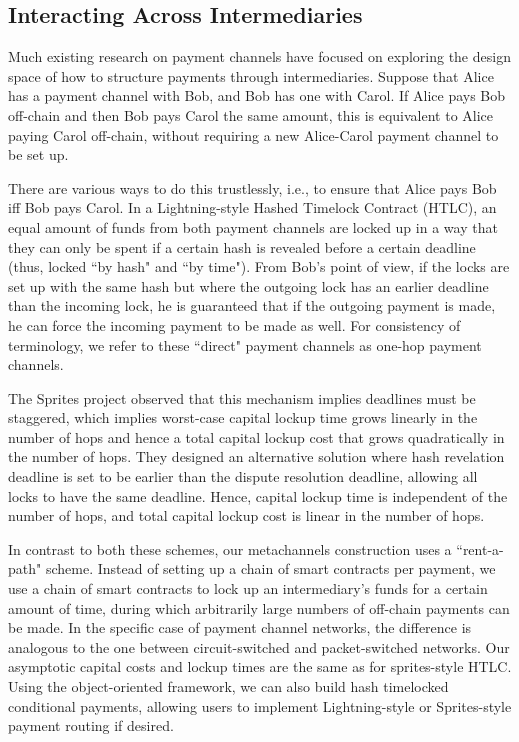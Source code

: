 \documentclass[prb,floatfix,reprint,nofootinbib,amsmath,amssymb,epsfig,pre,floats,letterpaper,groupedaffiliation,tightenlines,allcolors=blue,11pt]{revtex4}
\theoremstyle{definition}
\theoremstyle{definition}
\theoremstyle{definition}
\begin{document}
\subsection{Interacting Across Intermediaries}

Much existing research on payment channels have focused on exploring the design space of how to structure payments through intermediaries. Suppose that Alice has a payment channel with Bob, and Bob has one with Carol. If Alice pays Bob off-chain and then Bob pays Carol the same amount, this is equivalent to Alice paying Carol off-chain, without requiring a new Alice-Carol payment channel to be set up.

There are various ways to do this trustlessly, i.e., to ensure that Alice pays Bob iff Bob pays Carol. In a Lightning-style Hashed Timelock Contract (HTLC), an equal amount of funds from both payment channels are locked up in a way that they can only be spent if a certain hash is revealed before a certain deadline (thus, locked ``by hash" and ``by time"). From Bob's point of view, if the locks are set up with the same hash but where the outgoing lock has an earlier deadline than the incoming lock, he is guaranteed that if the outgoing payment is made, he can force the incoming payment to be made as well. For consistency of terminology, we refer to these ``direct" payment channels as one-hop payment channels.

The Sprites project \cite{sprites} observed that this mechanism implies deadlines must be staggered, which implies worst-case capital lockup time grows linearly in the number of hops and hence a total capital lockup cost that grows quadratically in the number of hops. They designed an alternative solution where hash revelation deadline is set to be earlier than the dispute resolution deadline, allowing all locks to have the same deadline. Hence, capital lockup time is independent of the number of hops, and total capital lockup cost is linear in the number of hops.

In contrast to both these schemes, our metachannels construction uses a ``rent-a-path" scheme. Instead of setting up a chain of smart contracts per payment, we use a chain of smart contracts to lock up an intermediary's funds for a certain amount of time, during which arbitrarily large numbers of off-chain payments can be made. In the specific case of payment channel networks, the difference is analogous to the one between circuit-switched and packet-switched networks. Our asymptotic capital costs and lockup times are the same as for sprites-style HTLC. Using the object-oriented framework, we can also build hash timelocked conditional payments, allowing users to implement Lightning-style or Sprites-style payment routing if desired.
\end{document}
